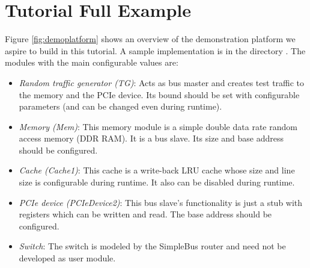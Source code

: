 
\newpage
\section{Tutorial Full Example}

Figure \ref{fig:demoplatform} shows an overview of the demonstration platform we aspire to build in this tutorial. A sample implementation is in the directory . The modules with the main configurable values are:
\begin{itemize}
	\item \textsl{Random traffic generator (TG)}: Acts as bus
master and creates test traffic to the memory and the PCIe device. Its
bound should be set with configurable parameters (and can be changed even during runtime).
	\item \textsl{Memory (Mem)}: This memory module is a simple double data rate random access memory (DDR RAM). It is a bus slave. Its size and base address should be configured.
	\item \textsl{Cache (Cache1)}: This cache is a write-back LRU cache whose size and line size is configurable during runtime. It also can be disabled during runtime.
	\item \textsl{PCIe device (PCIeDevice2)}: This bus slave's functionality is just a stub with registers which can be written and read. The base address should be configured.
	\item \textsl{Switch}: The switch is modeled by the SimpleBus router and need not be developed as user module.
\end{itemize}

